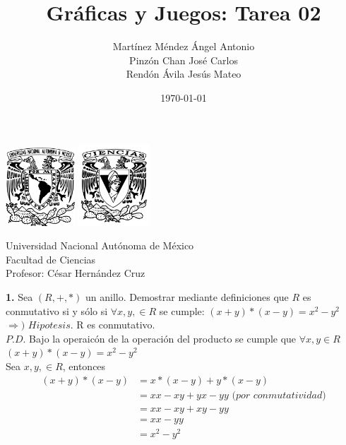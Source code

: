 \documentclass[12pt]{article}
\title{\textbf{Gráficas y Juegos: Tarea 02}}
\author{Martínez Méndez Ángel Antonio\\Pinzón Chan José Carlos\\Rendón Ávila Jesús Mateo}
\date{\today}
\begin{document}
\maketitle
\begin{center}
\vspace{3cm}
\includegraphics[width=0.195\textwidth]{Escudo.png}
\hspace{0.5cm}
\includegraphics[width=0.2\textwidth]{logo_ciencias.png}
\end{center}
\begin{center}
    \vspace{1cm}
    Universidad Nacional Autónoma de México\\
    Facultad de Ciencias\\
    Profesor: César Hernández Cruz\\
\end{center}

\newpage

%
%
\textbf{1.} Sea $(R, +, \ast)$ un anillo. Demostrar mediante definiciones que $R$ es conmutativo si y sólo si
$\forall x, y, \in R$ se cumple: $(x + y) \ast (x - y) = x^2 - y^2$\\

$\Longrightarrow)$ $Hipotesis$. R es conmutativo.\\

$P.D$. Bajo la operaicón de la operación del producto se cumple que $\forall x, y \in R$ $(x + y) \ast (x - y) = x^2 - y^2$\\

Sea $x, y, \in R$, entonces\\

\begin{align*}
    (x + y) \ast (x - y) &= x \ast (x - y) + y \ast (x - y)\\
    &= xx -xy +yx -yy \textit{ (por conmutatividad)}\\
    &= xx -xy +xy -yy\\
    &= xx - yy\\
    &= x^2 -y^2\\
\end{align*} 
\end{document}
